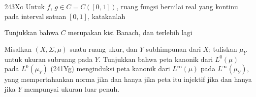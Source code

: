 {\vspheader{48pt}243Xo Untuk $f$, $g\in C=C([0,1])$, ruang fungsi
bernilai real yang kontinu pada interval satuan $[0,1]$, katakanlah
     
     
     
\noindent Tunjukkan bahwa $C$ merupakan kisi Banach, dan terlebih lagi
     
     
     
     
 Misalkan $(X,\Sigma,\mu)$ suatu
ruang ukur, dan $Y$ subhimpunan dari $X$; tuliskan $\mu_Y$ untuk ukuran
subruang pada $Y$. Tunjukkan bahwa peta kanonik dari $L^0(\mu)$ pada
$L^0(\mu_Y)$ (241Yg) menginduksi peta kanonik dari
$L^{\infty}(\mu)$ pada $L^{\infty}(\mu_Y)$, yang mempertahankan norma
jika dan hanya jika peta itu injektif jika dan hanya jika $Y$ mempunyai
ukuran luar penuh.
     
}%
     

